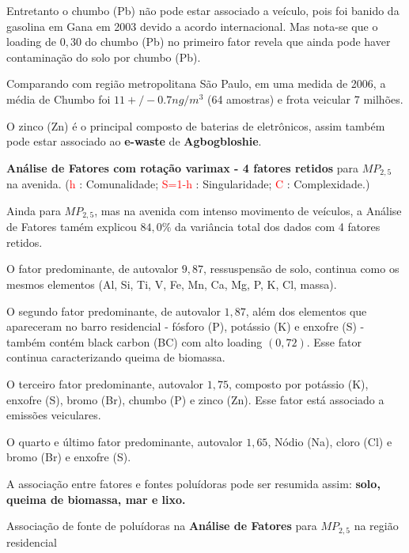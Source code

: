 Entretanto o chumbo (Pb) não pode estar associado a veículo, pois 
foi banido da gasolina em Gana em 2003 devido a acordo internacional. 
Mas nota-se que o loading de $0,30$ do chumbo (Pb) no primeiro fator revela 
que ainda pode haver contaminação do solo por chumbo (Pb).

Comparando com região metropolitana São Paulo, em uma medida de 2006, a média de Chumbo foi $11 +/- 0.7 ng/m^3$  
(64 amostras) e frota veicular 7 milhões. 

O zinco (Zn) é o principal composto de baterias de eletrônicos, assim também 
pode estar associado ao \textbf{e-waste} de \textbf{Agbogbloshie}.

\begin{table}[H]
  \caption{\textbf{Análise de Fatores com rotação varimax - 4 fatores retidos} 
             para $MP_{2,5}$ na avenida.
           (\textcolor{red}{h} : Comunalidade; 
           \textcolor{red}{S=1-h} : Singularidade; 
           \textcolor{red}{C} : Complexidade.)}
  
\end{table}

Ainda para $MP_{2,5}$, mas na avenida com intenso movimento de veículos,
a Análise de Fatores tamém explicou $84,0\%$ da variância total 
dos dados com 4 fatores retidos.

O fator predominante, de autovalor $9,87$, ressuspensão de solo, continua 
como os mesmos elementos (Al, Si, Ti, V, Fe, Mn, Ca, Mg, P, K, Cl, massa).

O segundo fator predominante, de autovalor $1,87$, além dos elementos que 
apareceram no barro residencial - fósforo (P), potássio (K) e enxofre (S) -
também contém black carbon (BC) com alto loading $(0,72)$. 
Esse fator continua caracterizando queima de biomassa.

O terceiro fator predominante, autovalor $1,75$, composto por
potássio (K), enxofre (S), bromo (Br), chumbo (P) e zinco (Zn). 
Esse fator está associado a emissões veiculares. 

O quarto e último fator predominante, autovalor $1,65$, 
Nódio (Na), cloro (Cl) e bromo (Br) e enxofre (S).

A associação entre fatores e fontes poluídoras pode ser resumida
assim: \textbf{solo, queima de biomassa, mar e lixo.}

\begin{table}[H]
  \centering
  \caption{Associação de fonte de poluídoras na \textbf{Análise de Fatores}
         para $MP_{2,5}$ na região residencial}
  
\end{table}

